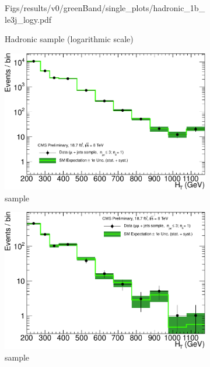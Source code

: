 \begin{figure}[h!]
\begin{subfigure}[b]{0.48\textwidth}
    {Figs/results/v0/greenBand/single_plots/hadronic_1b_le3j_logy.pdf}
    \caption{Hadronic sample (logarithmic scale)}
  \end{subfigure}
  \begin{subfigure}[b]{0.48\textwidth}
    \includegraphics[width=\textwidth]
    {Figs/results/v0/greenBand/single_plots/muon_1b_le3j_logy.pdf}
    \caption{\mj sample}
  \end{subfigure}
  \begin{subfigure}[b]{0.48\textwidth}
    \includegraphics[width=\textwidth]
    {Figs/results/v0/greenBand/single_plots/mumu_1b_le3j_logy.pdf}
    \caption{\mmj sample}
  \end{subfigure}\\
  \vspace{0.7cm}\begin{subfigure}[b]{0.48\textwidth}

\end{subfigure}
\end{figure}
